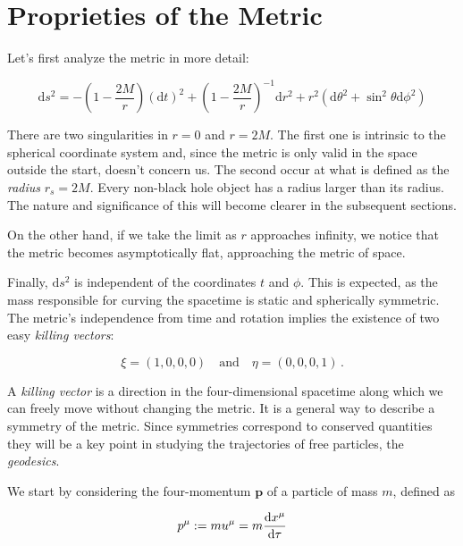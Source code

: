 \newpage


\section{Proprieties of the Metric}

Let's first analyze the \Sh metric in more detail:

\begin{equation}
    \mathrm{d}s^2 = - \left(1 - \frac{2 M}{r} \right) (\mathrm{d}t)^2
    + \left(1 - \frac{2 M}{r} \right)^{-1} \mathrm{d}r^2
    + r^2 (\mathrm{d}\theta^2 + \sin^2 \theta \mathrm{d}\phi^2)
    \label{eq:Sh_ds}
\end{equation}

There are two singularities in $r = 0$ and $r = 2M$.
The first one is intrinsic to the spherical coordinate system and, since the
metric is only valid in the space outside the start, doesn't concern us.
The second occur at what is defined as the \textit{\Sh radius} $r_s = 2M$.
Every non-black hole object has a radius larger than its \Sh radius.
The nature and significance of this will become clearer in the subsequent
sections.

On the other hand, if we take the limit as $r$ approaches infinity, we notice that the
metric becomes asymptotically flat, approaching the metric of \Mi space.

Finally, $\mathrm{d}s^2$ is independent of the coordinates $t$ and $\phi$.
This is expected, as the mass responsible for curving the spacetime is static
and spherically symmetric.
The metric’s independence from time and rotation implies the existence of two
easy \textit{killing vectors}:

\begin{equation}
    \xi = (1, 0, 0, 0) \quad \text{and} \quad \eta = (0, 0, 0, 1) \, .
    \label{eq:xi_eta}
\end{equation}

A \textit{killing vector} is a direction in the four-dimensional spacetime
along which we can freely move without changing the metric.
It is a general way to describe a symmetry of the metric.
Since symmetries correspond to conserved quantities they will be a key point in
studying the trajectories of free particles, the \textit{geodesics}.

We start by considering the four-momentum $\mathbf{p}$ of a particle of mass
$m$, defined as

\begin{equation}
    p^\mu := m u^\mu = m \dv{x^\mu}{\tau}
\end{equation}

